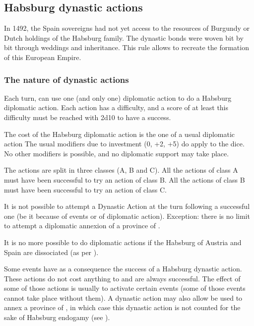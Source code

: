 \label{chSpecific:Spain}



\subsection{Habsburg dynastic actions}\label{chSpecific:Spain:Dynastic Actions}

\begin{histoire}
  In 1492, the Spain sovereigns had not yet access to the resources of
  Burgundy or Dutch holdings of the Habsburg family. The dynastic bonds
  were woven bit by bit through weddings and inheritance. This rule
  allows to recreate the formation of this European Empire.
\end{histoire}


\subsubsection{The nature of dynastic actions}
\aparag Each turn, \SPA can use one (and only one) diplomatic action to
do a Habsburg diplomatic action. Each action has a difficulty, and a
score of at least this difficulty must be reached with 2d10 to have a
success.

\aparag The cost of the Habsburg diplomatic action is the one of a usual
diplomatic action
\bparag The usual modifiers due to investment (0, +2, +5) do apply to
the dice.
\bparag No other modifiers is possible, and no diplomatic support may
take place.

\aparag The actions are split in three classes (A, B and C). All the
actions of class A must have been successful to try an action of class
B. All the actions of class B must have been successful to try an action
of class C.

\aparag It is not possible to attempt a Dynastic Action at the turn
following a successful one (be it because of events or of diplomatic
action). Exception: there is no limit to attempt a diplomatic annexion
of a province of .

\aparag It is no more possible to do diplomatic actions if the Habsburg
of Austria and Spain are dissociated (as per ).

\aparag Some events have as a consequence the success of a Habsburg
dynastic action. These actions do not cost anything to \SPA and are
always successful.
\bparag The effect of some of those actions is usually to activate
certain events (some of those events cannot take place without them).
\bparag A dynastic action may also allow be used to annex a province of
, in which case this dynastic action is not counted
for the sake of Habsburg endogamy (see ).


